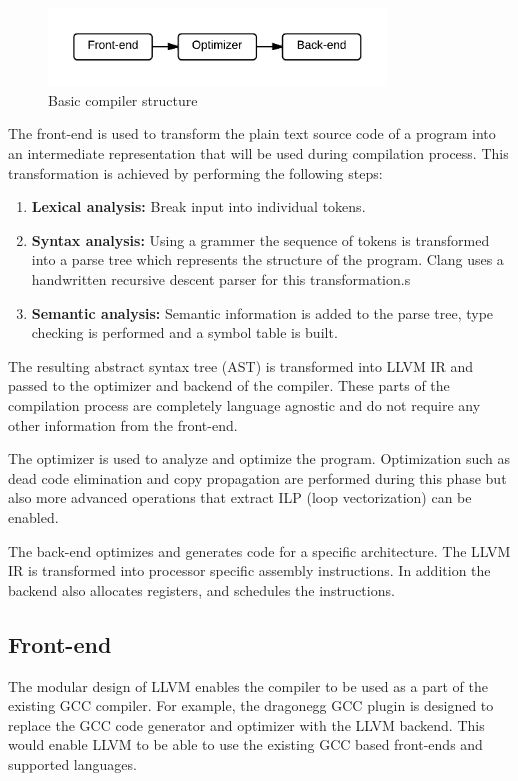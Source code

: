 \begin{figure}[ht]
\centering
\includegraphics[width=0.8\textwidth]{2_background/img/Basic_compiler.png}
\caption{Basic compiler structure}
\label{fig:compiler_structure}
\end{figure}

The front-end is used to transform the plain text source code of a program into an intermediate representation that will be used during compilation process. This transformation is achieved by performing the following steps:

\begin{enumerate}
	\item \textbf{Lexical analysis:} Break input into individual tokens.
	\item \textbf{Syntax analysis:} Using a grammer the sequence of tokens is transformed into a parse tree which represents the structure of the program. Clang uses a handwritten recursive descent parser for this transformation.s
	\item \textbf{Semantic analysis:} Semantic information is added to the parse tree, type checking is performed and a symbol table is built.
\end{enumerate}

The resulting abstract syntax tree (AST) is transformed into LLVM IR and passed to the optimizer and backend of the compiler. These parts of the compilation process are completely language agnostic and do not require any other information from the front-end.

The optimizer is used to analyze and optimize the program. Optimization such as dead code elimination and copy propagation are performed during this phase but also more advanced operations that extract ILP (loop vectorization) can be enabled.

The back-end optimizes and generates code for a specific architecture. The LLVM IR is transformed into processor specific assembly instructions. In addition the backend also allocates registers, and schedules the instructions.

\subsection{Front-end}
The modular design of LLVM enables the compiler to be used as a part of the existing GCC compiler. For example, the dragonegg GCC plugin is designed to replace the GCC code generator and optimizer with the LLVM backend. This would enable LLVM to be able to use the existing GCC based front-ends and supported languages.

